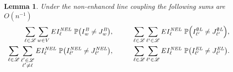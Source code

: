 \documentclass{amsart}
\newcommand{\vect}[1]{{ #1}}
\newcommand{\prob}{\mathbb{P}}
\newcommand{\B}{I^{\text{\em B}}}
\newcommand{\OL}{I^{\emptyset\text{\em L}}}
\newcommand{\EL}{I^{\text{\em EL}}}
\newcommand{\NEL}{I^{\text{\em NEL}}}
\newcommand{\JB}{J^{\text{\em B}}}
\newcommand{\JOL}{J^{\emptyset\text{\em L}}}
\newcommand{\JEL}{J^{\text{\em EL}}}
\newcommand{\JNEL}{J^{\text{\em NEL}}}
\numberwithin{equation}{section}
\newcommand{\lineset}{\mathscr{L}}
\newcommand{\Ln}{\ell}
\newtheorem{lemma}[theorem]{Lemma}
\theoremstyle{definition}
\theoremstyle{remark}
\begin{document}
\begin{lemma}
\label{nel-coupling-lem}
Under the non-enhanced line coupling the following sums are $O(n^{-1})$
\begin{align*}
\sum_{\Ln \in \lineset} \sum_{\vect{w}\in V} E\NEL_\Ln\ \prob{\left(\B_{\vect{w}} \neq \JB_{\vect{w}}\right)}, & \hspace{1cm} 
\sum_{\Ln \in \lineset} \sum_{\Ln' \in \lineset} E\NEL_\Ln\ \prob{\left(\OL_{\Ln'} \neq \JOL_{\Ln'}\right)},
\hspace{1cm}  \\
\sum_{\Ln \in \lineset} \sum_{\substack{\Ln' \in \lineset\\ \Ln'\neq \Ln}} E\NEL_\Ln\ \prob{\left(\NEL_{\Ln'}\neq \JNEL_{\Ln'}\right)}, &\hspace{1cm} 
\sum_{\Ln \in \lineset} \sum_{\Ln' \in \lineset} E\NEL_\Ln\ \prob{\left(\EL_{\Ln'} \neq \JEL_{\Ln'}\right)} .
\end{align*}
\end{lemma}
\end{document}
